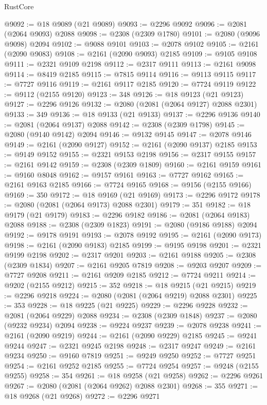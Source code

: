 \begin{lexlean}{RustCore}
\begin{coremodule}
@9092 := @18 @9089 (@21 @9089)
@9093 := @2296 @9092
@9096 := @2081 (@2064 @9093) @2088
@9098 := @2308 (@2309 @1780)
@9101 := @2080 (@9096 @9098) @2094
@9102 := @9088 @9101
@9103 := @2078 @9102
@9105 := @2161 (@2090 @9083)
@9108 := @2161 (@2090 @9093) @2185
@9109 := @9105 @9108
@9111 := @2321 @9109 @2198
@9112 := @2317 @9111
@9113 := @2161 @9098
@9114 := @8419 @2185
@9115 := @7815 @9114
@9116 := @9113 @9115
@9117 := @7727 @9116
@9119 := @2161 @9117 @2185
@9120 := @7724 @9119
@9122 := @9112 (@2155 @9120)
@9123 := 348
@9126 := @18 @9123 (@21 @9123)
@9127 := @2296 @9126
@9132 := @2080 (@2081 (@2064 @9127) @2088 @2301)
@9133 := 349
@9136 := @18 @9133 (@21 @9133)
@9137 := @2296 @9136
@9140 := @2081 (@2064 @9137) @2088
@9142 := @2308 (@2309 @1798)
@9145 := @2080 (@9140 @9142) @2094
@9146 := @9132 @9145
@9147 := @2078 @9146
@9149 := @2161 (@2090 @9127)
@9152 := @2161 (@2090 @9137) @2185
@9153 := @9149 @9152
@9155 := @2321 @9153 @2198
@9156 := @2317 @9155
@9157 := @2161 @9142
@9159 := @2308 (@2309 @1809)
@9160 := @2161 @9159
@9161 := @9160 @8048
@9162 := @9157 @9161
@9163 := @7727 @9162
@9165 := @2161 @9163 @2185
@9166 := @7724 @9165
@9168 := @9156 (@2155 @9166)
@9169 := 350
@9172 := @18 @9169 (@21 @9169)
@9173 := @2296 @9172
@9178 := @2080 (@2081 (@2064 @9173) @2088 @2301)
@9179 := 351
@9182 := @18 @9179 (@21 @9179)
@9183 := @2296 @9182
@9186 := @2081 (@2064 @9183) @2088
@9188 := @2308 (@2309 @1823)
@9191 := @2080 (@9186 @9188) @2094
@9192 := @9178 @9191
@9193 := @2078 @9192
@9195 := @2161 (@2090 @9173)
@9198 := @2161 (@2090 @9183) @2185
@9199 := @9195 @9198
@9201 := @2321 @9199 @2198
@9202 := @2317 @9201
@9203 := @2161 @9188
@9205 := @2308 (@2309 @1834)
@9207 := @2161 @9205 @7819
@9208 := @9203 @9207
@9209 := @7727 @9208
@9211 := @2161 @9209 @2185
@9212 := @7724 @9211
@9214 := @9202 (@2155 @9212)
@9215 := 352
@9218 := @18 @9215 (@21 @9215)
@9219 := @2296 @9218
@9224 := @2080 (@2081 (@2064 @9219) @2088 @2301)
@9225 := 353
@9228 := @18 @9225 (@21 @9225)
@9229 := @2296 @9228
@9232 := @2081 (@2064 @9229) @2088
@9234 := @2308 (@2309 @1848)
@9237 := @2080 (@9232 @9234) @2094
@9238 := @9224 @9237
@9239 := @2078 @9238
@9241 := @2161 (@2090 @9219)
@9244 := @2161 (@2090 @9229) @2185
@9245 := @9241 @9244
@9247 := @2321 @9245 @2198
@9248 := @2317 @9247
@9249 := @2161 @9234
@9250 := @9160 @7819
@9251 := @9249 @9250
@9252 := @7727 @9251
@9254 := @2161 @9252 @2185
@9255 := @7724 @9254
@9257 := @9248 (@2155 @9255)
@9258 := 354
@9261 := @18 @9258 (@21 @9258)
@9262 := @2296 @9261
@9267 := @2080 (@2081 (@2064 @9262) @2088 @2301)
@9268 := 355
@9271 := @18 @9268 (@21 @9268)
@9272 := @2296 @9271

\end{coremodule}
\end{lexlean}
